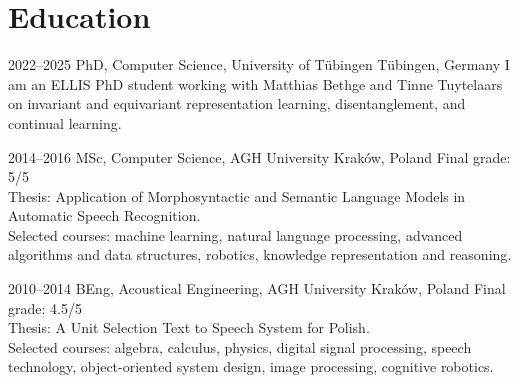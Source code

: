 \documentclass[]{friggeri-cv_osx}
\begin{document}
\section{Education}
\begin{entrylist}

\entry
{2022–2025}
{PhD, Computer Science, University of Tübingen}
{Tübingen, Germany}
{I am an ELLIS PhD student working with Matthias Bethge and Tinne Tuytelaars on invariant and equivariant representation learning, disentanglement, and continual learning.\\}

\entry
{2014–2016}
{MSc, Computer Science, AGH University}
{Kraków, Poland}
{Final grade: 5/5\\
Thesis: Application of Morphosyntactic and Semantic Language Models in Automatic Speech Recognition.\\
Selected courses: machine learning, natural language processing, advanced algorithms and data structures, robotics, knowledge representation and reasoning.\\}

\entry
{2010–2014}
{BEng, Acoustical Engineering, AGH University}
{Kraków, Poland}
{Final grade: 4.5/5\\
Thesis: A Unit Selection Text to Speech System for Polish.\\
Selected courses: algebra, calculus, physics, digital signal processing, speech technology, object-oriented system design, image processing, cognitive robotics.}
\end{entrylist}


\newpage
\end{document}
